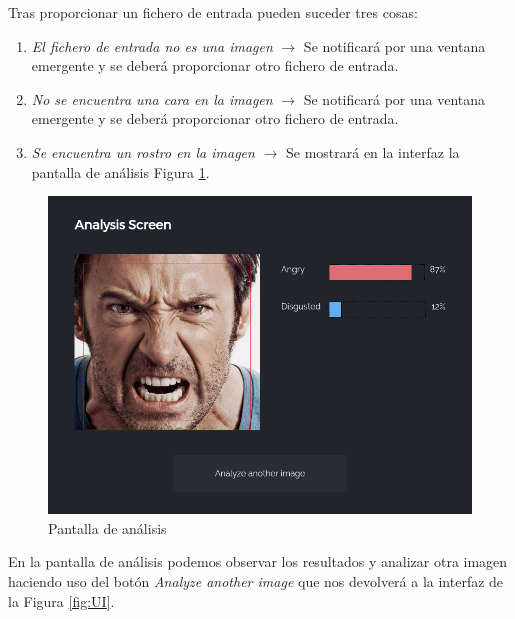 \documentclass[a4paper,11pt]{book}
\begin{document}
Tras proporcionar un fichero de entrada pueden suceder tres cosas:\\
\begin{enumerate}
	\item \textit{El fichero de entrada no es una imagen} \(\rightarrow\) Se notificará por una ventana emergente y se deberá proporcionar otro fichero de entrada.
	\item \textit{No se encuentra una cara en la imagen} \(\rightarrow\) Se notificará por una ventana emergente y se deberá proporcionar otro fichero de entrada.
	\item \textit{Se encuentra un rostro en la imagen} \(\rightarrow\) Se mostrará en la interfaz la pantalla de análisis Figura \ref{fig:analysiscreen}.
\end{enumerate}
\begin{figure}[h]
\centering
\includegraphics[width=0.7\linewidth]{imagenes/analysiscreen}
\caption[Pantalla de análisis]{Pantalla de análisis}
\label{fig:analysiscreen}
\end{figure}

En la pantalla de análisis podemos observar los resultados y analizar otra imagen haciendo uso del botón \textit{Analyze another image} que nos devolverá a la interfaz de la Figura \ref{fig:UI}.




%
%
%
%
%
%
%
%
%
%
%
%
%
%
%
%
%
%
%
%
%
\chapter*{}
\thispagestyle{empty}
\end{document}
